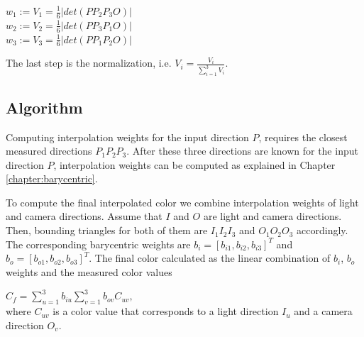 {\centering $w_{1}:=V_{1}=\frac{1}{6}\left | det(PP_{2}P_{3}O) \right |$ \\}
{\centering $w_{2}:=V_{2}=\frac{1}{6}\left | det(PP_{3}P_{1}O) \right |$ \\}
{\centering $w_{3}:=V_{3}=\frac{1}{6}\left | det(PP_{1}P_{2}O) \right |$ \\}

The last step is the normalization, i.e. $V_{i}=\frac{V_{i}}{\sum_{i=1}^{3}V_{i}}$.


\subsection{Algorithm}
\label{chapter:interp_algo}

Computing interpolation weights for the input direction $P$, requires the closest measured directions $P_{1}P_{2}P_{3}$.
After these three directions are known for the input direction $P$, interpolation weights can be computed
as explained in Chapter \ref{chapter:barycentric}.
  
To compute the final interpolated color we combine interpolation weights of light and camera directions.
Assume that $I$ and $O$ are light and camera directions. 
Then, bounding triangles for both of them are $I_{1}I_{2}I_{3}$ and $O_{1}O_{2}O_{3}$ accordingly.
The corresponding barycentric weights are $b_{i}=[b_{i1},b_{i2},b_{i3}]^T$ and $b_{o}=[b_{o1},b_{o2},b_{o3}]^T$.
The final color calculated as the linear combination of $b_{i}$, $b_{o}$ weights and the  measured color values 

 {\centering $ C_{f}=\sum_{u=1}^{3}b_{iu}\sum_{v=1}^{3}b_{ov}C_{uv},$\\} where $C_{uv}$ is a color value that corresponds to a light direction $I_{u}$ and a camera direction $O_{v}$.


